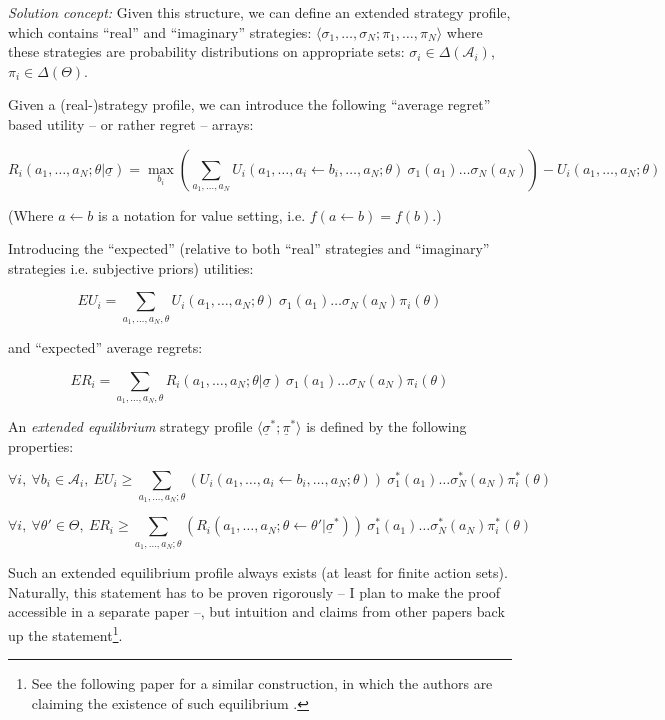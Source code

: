 \documentclass{article}
\begin{document}
{\it Solution concept:}
Given this structure, we can define an extended strategy profile, which contains ``real'' and ``imaginary'' strategies: $\langle \sigma_1,\dots,\sigma_N; \pi_1,\dots,\pi_N \rangle$ where these strategies are probability distributions on appropriate sets:
$\sigma_i \in \Delta(\mathcal{A}_i)$, $\pi_i \in \Delta(\Theta)$.

Given a (real-)strategy profile, we can introduce the following ``average regret'' based utility -- or rather regret --  arrays:

\[
R_i (a_1,\dots,a_N;\theta | \underline{\sigma}) = \max_{b_i} 
\left (
\sum_{a_1,\dots,a_N} U_i(a_1,\dots,a_i \leftarrow b_i,\dots,a_N;\theta) \ 
\sigma_1(a_1) \dots \sigma_N(a_N)
\right )
- U_i(a_1,\dots,a_N;\theta)
\]

(Where $a \leftarrow b$ is a notation for value setting, i.e. $f(a \leftarrow b) = f(b)$.)

Introducing the ``expected'' (relative to both ``real'' strategies and ``imaginary'' strategies i.e. subjective priors) utilities:

\[
EU_i = 
\sum_{a_1,\dots,a_N,\theta} 
U_i(a_1,\dots,a_N;\theta) \ \sigma_1(a_1) \dots \sigma_N(a_N) \pi_i(\theta)
\]

and ``expected'' average regrets:

\[
ER_i =
\sum_{a_1,\dots,a_N,\theta} 
R_i(a_1,\dots,a_N;\theta | \underline{\sigma}) \ \sigma_1(a_1)\dots\sigma_N(a_N) \pi_i(\theta)
\]

An \emph{extended equilibrium} strategy profile $\langle \underline{\sigma}^*; \underline{\pi}^* \rangle$ is defined by the following properties:

\[
\forall i, \
\forall b_i \in \mathcal{A}_i, \ 
EU_i \ge
\sum_{a_1,\dots,a_N;\theta} 
\left (
U_i(a_1,\dots,a_i \leftarrow b_i,\dots,a_N;\theta)
\right ) \ 
\sigma^*_1(a_1) \dots \sigma^*_N(a_N) \pi^*_i(\theta)
\]

\[
\forall i, \
\forall \theta' \in \Theta, \ 
ER_i \ge
\sum_{a_1,\dots,a_N;\theta} 
\left (
R_i(a_1,\dots,a_N;\theta \leftarrow \theta' | \underline{\sigma}^*)
\right ) \ 
\sigma^*_1(a_1) \dots \sigma^*_N(a_N) \pi^*_i(\theta)
\]

Such an extended equilibrium profile always exists (at least for finite action sets). Naturally, this statement has to be proven rigorously -- I plan to make the proof accessible in a separate paper --, but intuition and claims from other papers back up the statement\footnote{See the following paper for a similar construction, in which the authors are claiming the existence of such equilibrium \cite{arxiv:RegretMinimizingEquilibria}.}.
\end{document}
